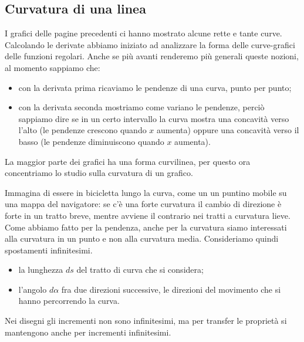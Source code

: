 \subsection{Curvatura di una linea}
I grafici delle pagine precedenti ci hanno mostrato alcune rette e tante curve. 
Calcolando le derivate abbiamo iniziato ad analizzare la forma delle 
curve-grafici delle funzioni regolari. Anche se più avanti renderemo più 
generali queste nozioni, al momento sappiamo che:
\begin{itemize}[nosep]
 \item con la derivata prima ricaviamo le pendenze di una curva, punto per 
punto;
\item con la derivata seconda mostriamo come variano le pendenze, perciò 
sappiamo dire se in un certo intervallo la curva mostra una concavità 
verso l'alto (le pendenze crescono quando \(x\) aumenta) oppure una 
concavità verso il basso (le pendenze diminuiscono quando \(x\) aumenta).
\end{itemize}
La maggior parte dei grafici ha una forma curvilinea, per questo ora 
concentriamo lo studio sulla curvatura di un grafico. 

Immagina di essere in 
bicicletta lungo la curva, come un un puntino mobile su una mappa del 
navigatore: se c'è una forte curvatura il cambio di direzione è forte in un 
tratto breve, mentre avviene il contrario nei tratti a curvatura lieve. 
Come abbiamo fatto per la pendenza, anche per la curvatura siamo interessati 
alla curvatura in un punto e non alla curvatura media. Consideriamo quindi 
spostamenti infinitesimi.
\begin{itemize}[nosep]
\item la lunghezza \(ds\) del tratto di curva che si considera;
 \item l'angolo \(d\alpha\) fra due direzioni successive, le direzioni del 
movimento che si hanno percorrendo la curva.
\end{itemize}

Nei disegni gli incrementi non sono infinitesimi, ma per transfer le 
proprietà si mantengono anche per incrementi infinitesimi.

